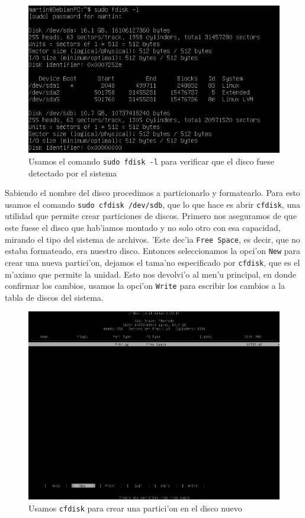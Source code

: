 \documentclass[11pt]{article}
\begin{document}
		\begin{figure}[H]
    			\centering \captionsetup{justification=centering}
    			\includegraphics[scale=0.55]{Images/rsync/rsync_disk_info.PNG}
    			\caption{Usamos el comando \texttt{sudo fdisk -l} para verificar que el disco fuese detectado por el sistema}
    			\label{fig:rsync_disk_info}
		\end{figure}

		Sabiendo el nombre del disco procedimos a particionarlo y formatearlo. Para esto usamos el comando \texttt{sudo cfdisk /dev/sdb}, que lo que hace es abrir \texttt{cfdisk}, una utilidad que permite crear particiones de discos. Primero nos aseguramos de que este fuese el disco que hab'iamos montado y no solo otro con esa capacidad, mirando el tipo del sistema de archivos. 'Este dec'ia \texttt{Free Space}, es decir, que no estaba formateado, era nuestro disco. Entonces seleccionamos la opci'on \texttt{New} para crear una nueva partici'on, dejamos el tama'no especificado por \texttt{cfdisk}, que es el m'aximo que permite la unidad. Esto nos devolvi'o al men'u principal, en donde confirmar los cambios, usamos la opci'on \texttt{Write} para escribir los cambios a la tabla de discos del sistema. 

		\begin{figure}[H]
    			\centering \captionsetup{justification=centering}
    			\includegraphics[scale=0.40]{Images/rsync/rsync_disk_partition.PNG}
    			\caption{Usamos \texttt{cfdisk} para crear una partici'on en el disco nuevo}
    			\label{fig:rsync_disk_partition}
		\end{figure}
\end{document}
